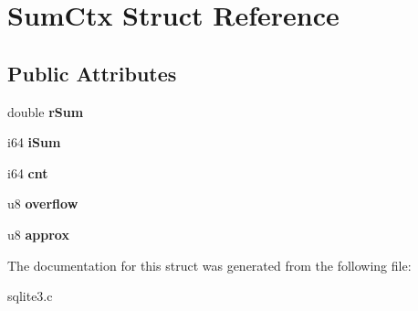 \hypertarget{struct_sum_ctx}{\section{Sum\-Ctx Struct Reference}
\label{struct_sum_ctx}
}
\subsection*{Public Attributes}
\begin{DoxyCompactItemize}
\item 
\hypertarget{struct_sum_ctx_a1774080b9bcada2f4e867eaf40763f41}{double {\bfseries r\-Sum}}\label{struct_sum_ctx_a1774080b9bcada2f4e867eaf40763f41}

\item 
\hypertarget{struct_sum_ctx_ace6196fb30ebc0687997a723d55683db}{i64 {\bfseries i\-Sum}}\label{struct_sum_ctx_ace6196fb30ebc0687997a723d55683db}

\item 
\hypertarget{struct_sum_ctx_ada00261fe604a7cc6719fdcd8bb5914c}{i64 {\bfseries cnt}}\label{struct_sum_ctx_ada00261fe604a7cc6719fdcd8bb5914c}

\item 
\hypertarget{struct_sum_ctx_a3b14a5da00584aff08314d5e9ddbe9ea}{u8 {\bfseries overflow}}\label{struct_sum_ctx_a3b14a5da00584aff08314d5e9ddbe9ea}

\item 
\hypertarget{struct_sum_ctx_a035a2a22271fee066d9a92d12fe3b9a5}{u8 {\bfseries approx}}\label{struct_sum_ctx_a035a2a22271fee066d9a92d12fe3b9a5}

\end{DoxyCompactItemize}


The documentation for this struct was generated from the following file\-:\begin{DoxyCompactItemize}
\item 
sqlite3.\-c\end{DoxyCompactItemize}
